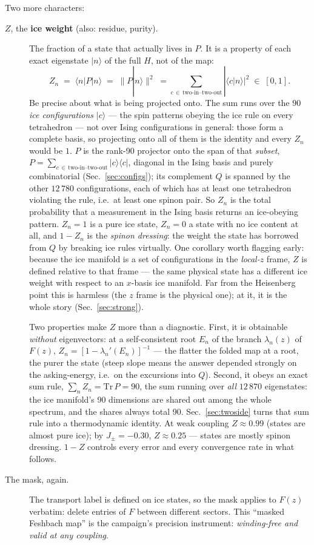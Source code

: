 \documentclass[11pt,a4paper]{article}
\newcommand{\Jpm}{J_{\pm}}
\begin{document}
Two more characters:
\begin{description}
\item[$Z$, the \textbf{ice weight} (also: residue, purity).]  The fraction
of a state that actually lives in $P$.  It is a property of each exact
eigenstate $|n\rangle$ of the full $H$, not of the map:
\[
Z_n \;=\; \langle n|P|n\rangle \;=\; \bigl\| P|n\rangle \bigr\|^2
       \;=\!\!\!\!\sum_{c\,\in\,\text{two-in--two-out}}\!\!\!\!
         |\langle c|n\rangle|^2
       \;\in\;[0,1].
\]
Be precise about what is being projected onto.  The sum runs over the $90$
\emph{ice configurations} $|c\rangle$ --- the spin patterns obeying the ice
rule on every tetrahedron --- not over Ising configurations in general:
those form a complete basis, so projecting onto all of them is the identity
and every $Z_n$ would be $1$.  $P$ is the rank-90 projector onto the span
of that \emph{subset},
$P=\sum_{c\,\in\,\text{two-in--two-out}}|c\rangle\langle c|$, diagonal in
the Ising basis and purely combinatorial (Sec.~\ref{sec:configs}); its
complement $Q$ is spanned by the other $12\,780$ configurations, each of
which has at least one tetrahedron violating the rule, i.e.\ at least one
spinon pair.  So $Z_n$ is the total probability that a measurement in the
Ising basis returns an ice-obeying pattern.  $Z_n=1$ is a pure ice state,
$Z_n=0$ a state with no ice
content at all, and $1-Z_n$ is the \emph{spinon dressing}: the weight the
state has borrowed from $Q$ by breaking ice rules virtually.  One corollary
worth flagging early: because the ice manifold is a set of configurations
in the \emph{local-$z$} frame, $Z$ is defined relative to that frame ---
the same physical state has a different ice weight with respect to an
$x$-basis ice manifold.  Far from the Heisenberg point this is harmless
(the $z$ frame is the physical one); at it, it is the whole story
(Sec.~\ref{sec:strong}).

Two properties make $Z$ more than a diagnostic.  First, it is obtainable
\emph{without} eigenvectors: at a self-consistent root $E_n$ of the
branch $\lambda_n(z)$ of $F(z)$, $Z_n=[1-\lambda_n'(E_n)]^{-1}$ --- the
flatter the folded map at a root, the purer the state (steep slope means
the answer depended strongly on the asking-energy, i.e.\ on the
excursions into $Q$).  Second, it obeys an exact sum rule,
$\sum_n Z_n = \mathrm{Tr}\,P = 90$, the sum running over \emph{all}
$12\,870$ eigenstates: the ice manifold's 90 dimensions are shared out
among the whole spectrum, and the shares always total 90.
Sec.~\ref{sec:twoside} turns that sum rule into a thermodynamic identity.
At weak coupling $Z\approx0.99$ (states are
almost pure ice); by $\Jpm=-0.30$, $Z\approx0.25$ --- states are mostly
spinon dressing.  $1-Z$ controls every error and every convergence rate in
what follows.
\item[The mask, again.]  The transport label is defined on ice states, so
the mask applies to $F(z)$ verbatim: delete entries of $F$ between different
sectors.  This ``masked Feshbach map'' is the campaign's precision
instrument: \emph{winding-free and valid at any coupling}.
\end{description}
\end{document}
